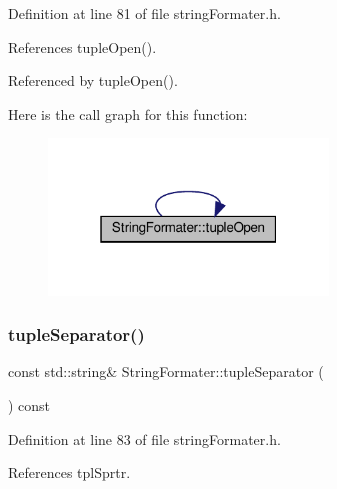 Definition at line 81 of file string\+Formater.\+h.



References tuple\+Open().



Referenced by tuple\+Open().

Here is the call graph for this function\+:
\nopagebreak
\begin{figure}[H]
\begin{center}
\leavevmode
\includegraphics[width=211pt]{classStringFormater_ac9d4c3bfaa5baaf7dc97768a9068128a_cgraph}
\end{center}
\end{figure}
\mbox{\label{classStringFormater_a9c1654f1f4e2f44a3bd8c0eff76f7d8f}} 
\subsubsection{\texorpdfstring{tuple\+Separator()}{tupleSeparator()}\hspace{0.1cm}{\footnotesize\ttfamily [1/2]}}
{\footnotesize\ttfamily const std\+::string\& String\+Formater\+::tuple\+Separator (\begin{DoxyParamCaption}{ }\end{DoxyParamCaption}) const\hspace{0.3cm}{\ttfamily [inline]}}



Definition at line 83 of file string\+Formater.\+h.



References tpl\+Sprtr.

\mbox{\label{classStringFormater_a20c69db03bbd7bfff3154b560ff0106b}} 
